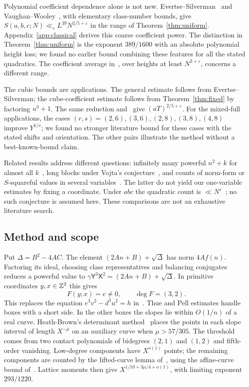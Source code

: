 \documentclass[11pt,reqno]{amsart}
\theoremstyle{definition}
\theoremstyle{remark}
\numberwithin{equation}{section}
\newcommand{\eps}{\varepsilon}\newcommand{\card}{\#}
\begin{document}
Polynomial coefficient dependence alone is not new.
Evertse--Silverman~\cite[Theorem~1]{es} and
Vaughan--Wooley~\cite[Lemma~3.5]{vw}, with elementary class-number bounds,
give $S(a,b,c;N)\ll_\eps L^{39}N^{2/5+\eps}$ in the range of
Theorem~\ref{thm:uniform}. Appendix~\ref{app:classical} derives this coarse
coefficient power. The distinction in Theorem~\ref{thm:uniform} is the
exponent $389/1600$ with an absolute polynomial height loss; we found no
earlier bound combining these features for all the stated quadratics.
The coefficient average in~\cite[Remark~4.5]{wm}, over heights at least
$N^{2+\eps}$, concerns a different range.

The cubic bounds are applications. The general estimate follows from
Evertse--Silverman; the cube-coefficient estimate follows from
Theorem~\ref{thm:fixed} by factoring $u^3+1$. The same reduction
and~\cite{saito} give $(aT)^{2/5+\eps}$. For the mixed-full applications,
the cases $(r,s)=(2,6),(3,6),(2,8),(3,8),(4,8)$ improve $Y^{1/s}$;
we found no stronger literature bound for these cases with the stated
shifts and orientation. The other pairs illustrate the method without
a best-known-bound claim.

Related results address different questions: infinitely many powerful
$n^2+k$ for almost all $k$~\cite{ddl}, long blocks under Vojta's
conjecture~\cite{pasten}, and counts of norm-form or $S$-squareful values
in several variables~\cite{streeter,pohl}. The latter do not yield our
one-variable estimates by fixing a coordinate. Under $abc$ the quadratic
count is $\ll N^\eps$~\cite[Proposition~3.7]{wm}; no such conjecture is
assumed here. These comparisons are not an exhaustive literature search.

\subsection{Method and scope}\label{sec:notclaimed}
Put $\Delta=B^2-4AC$. The element $(2An+B)+\sqrt\Delta$ has norm
$4Af(n)$. Factoring its ideal, choosing class representatives and
balancing conjugates reduces a powerful value to
$\gamma\mathsf Y^3\mathsf X^2=(2An+B)+\sqrt\Delta$.
In primitive coordinates $y,x\in\mathbb Z^2$ this gives
\begin{equation}\label{eq:introF}
 F(y;x)=e\ne0,\qquad \deg F=(3,2).
\end{equation}
This replaces the equation $e^3v^2-d^3u^2=h$ in~\cite{powerful}.
Thue and Pell estimates handle boxes with a short side. In the other
boxes the slopes lie within $O(1/n)$ of a real curve.
Heath-Brown's determinant method~\cite{hbannals,hb} places the points in
each slope interval of length $X^{-\mu}$ on an auxiliary curve when
$\mu>57/305$. The threshold comes from two contact polynomials of
bidegrees $(2,1)$ and $(1,2)$ and fifth-order vanishing.
Low-degree components have $X^{o(1)}$ points; the remaining components
are counted by the lifted-curve lemma of~\cite{powerful}, using the
affine-curve bound of~\cite{ccdn}. Lattice moments then give
$X^{1/10+3\mu/4+o(1)}$, with limiting exponent $293/1220$.
\end{document}
